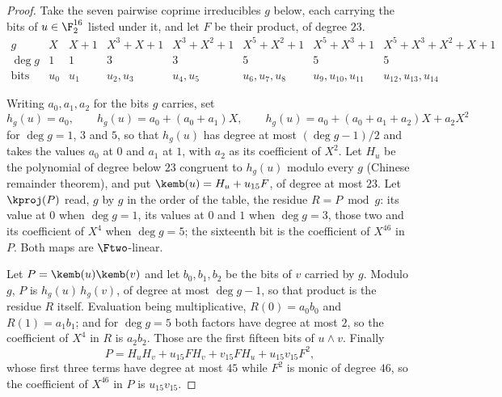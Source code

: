 \begin{proof}
Take the seven pairwise coprime irreducibles $g$ below, each carrying the bits of $u \in \F_2^{16}$ listed under it, and let $F$ be their product, of degree $23$.
{\setlength{\arraycolsep}{3pt}
\[
\begin{array}{c|c|c|c|c|c|c|c}
g & X & X+1 & X^3+X+1 & X^3+X^2+1 & X^5+X^2+1 & X^5+X^3+1 & X^5+X^3+X^2+X+1\\\hline
\deg g & 1 & 1 & 3 & 3 & 5 & 5 & 5\\
\text{bits} & u_0 & u_1 & u_2,u_3 & u_4,u_5 & u_6,u_7,u_8 & u_9,u_{10},u_{11} & u_{12},u_{13},u_{14}
\end{array}
\]}

Writing $a_0,a_1,a_2$ for the bits $g$ carries, set
\[
  h_g(u)=a_0,\qquad h_g(u)=a_0+(a_0+a_1)X,\qquad h_g(u)=a_0+(a_0+a_1+a_2)X+a_2X^{2}
\]
for $\deg g=1$, $3$ and $5$, so that $h_g(u)$ has degree at most $(\deg g-1)/2$ and takes the values $a_0$ at $0$ and $a_1$ at $1$, with $a_2$ as its coefficient of $X^{2}$. Let $H_u$ be the polynomial of degree below $23$ congruent to $h_g(u)$ modulo every $g$ (Chinese remainder theorem), and put $\kemb(u)=H_u+u_{15}F$, of degree at most $23$. Let $\kproj(P)$ read, $g$ by $g$ in the order of the table, the residue $R=P\bmod g$: its value at $0$ when $\deg g=1$, its values at $0$ and $1$ when $\deg g=3$, those two and its coefficient of $X^{4}$ when $\deg g=5$; the sixteenth bit is the coefficient of $X^{46}$ in $P$. Both maps are $\Ftwo$-linear.

Let $P=\kemb(u)\kemb(v)$ and let $b_0,b_1,b_2$ be the bits of $v$ carried by $g$. Modulo $g$, $P$ is $h_g(u)\,h_g(v)$, of degree at most $\deg g-1$, so that product is the residue $R$ itself. Evaluation being multiplicative, $R(0)=a_0b_0$ and $R(1)=a_1b_1$; and for $\deg g=5$ both factors have degree at most $2$, so the coefficient of $X^{4}$ in $R$ is $a_2b_2$. Those are the first fifteen bits of $u\wedge v$. Finally
\[
  P=H_uH_v+u_{15}FH_v+v_{15}FH_u+u_{15}v_{15}F^{2},
\]
whose first three terms have degree at most $45$ while $F^{2}$ is monic of degree $46$, so the coefficient of $X^{46}$ in $P$ is $u_{15}v_{15}$.
\end{proof}
